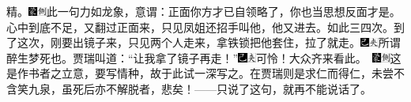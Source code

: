 精。{\includegraphics[width=3mm]{../Images/00006}\includegraphics[width=3mm]{../Images/00011}\footnotesize \kaishu 此一句力如龙象，意谓：正面你方才已自领略了，你也当思想反面才是。}心中到底不足，又翻过正面来，只见凤姐还招手叫他，他又进去。如此三四次。到了这次，刚要出镜子来，只见两个人走来，拿铁锁把他套住，拉了就走。{\includegraphics[width=3mm]{../Images/00003}\includegraphics[width=3mm]{../Images/00012}\footnotesize \kaishu 所谓醉生梦死也。}贾瑞叫道：``让我拿了镜子再走！''{\includegraphics[width=3mm]{../Images/00003}\includegraphics[width=3mm]{../Images/00012}\footnotesize \kaishu 可怜！大众齐来看此。　\includegraphics[width=3mm]{../Images/00006}\includegraphics[width=3mm]{../Images/00011}\footnotesize \kaishu 这是作书者之立意，要写情种，故于此试一深写之。在贾瑞则是求仁而得仁，未尝不含笑九泉，虽死后亦不解脱者，悲矣！}------只说了这句，就再不能说话了。

